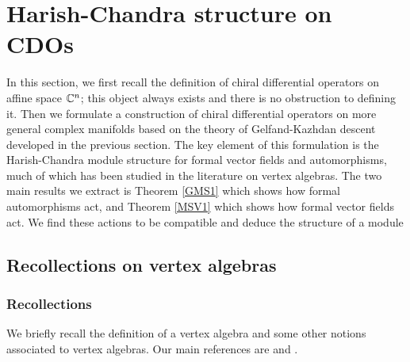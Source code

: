 \section{Harish-Chandra structure on CDOs} \label{sec vertex alg}

In this section, we first recall the definition of chiral differential
operators on affine space $\mathbb C^n$; this object always exists and there
is no obstruction to defining it. Then we formulate a construction of chiral differential
operators on more general complex manifolds based on the theory of
Gelfand-Kazhdan descent developed in the previous section. The key
element of this formulation is the Harish-Chandra module structure for
formal vector fields and automorphisms, much of which has been studied
in the literature on vertex algebras. The two main results we extract is
Theorem \ref{GMS1} which shows how formal automorphisms act, and Theorem
\ref{MSV1} which shows how formal vector fields act. We find these
actions to be compatible and deduce the structure of a module 

\subsection{Recollections on vertex algebras}

\subsubsection{Recollections}

We briefly recall the definition of a vertex algebra and some other notions associated to vertex algebras. 
Our main references are \cite{BZF} and \cite{Kac}.

